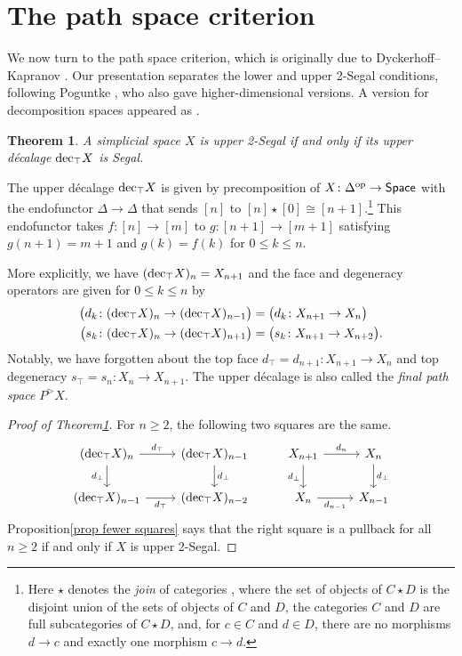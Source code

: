 \documentclass{conm-p-l}
\newtheorem{theorem}{Theorem}[section]
\theoremstyle{definition}
\theoremstyle{remark}
\newcommand{\spaces}{\mathsf{Space}}
\newcommand{\op}{\textup{op}}
\newcommand{\udec}{\textup{dec}_{\top}}
\begin{document}
\section{The path space criterion}\label{sec path space}

We now turn to the path space criterion, which is originally due to Dyckerhoff--Kapranov \cite[Theorem 6.3.2]{DyckerhoffKapranov:HSS}.
Our presentation separates the lower and upper 2-Segal conditions, following Poguntke \cite{Poguntke:HSSAKT}, who also gave higher-dimensional versions.
A version for decomposition spaces appeared as \cite[Theorem 4.10]{GKT1}.

\begin{theorem}\label{thm upper path}
A simplicial space $X$ is upper 2-Segal if and only if its upper d\'ecalage $\udec X$ is Segal.
\end{theorem}

The upper d\'ecalage $\udec X$ is given by precomposition of $X \colon \Delta^\op \to \spaces$ with the endofunctor $\Delta \to \Delta$ that sends $[n]$ to $[n]\star [0] \cong [n+1]$.\footnote{
Here $\star$ denotes the \emph{join} of categories \cite[\href{https://kerodon.net/tag/0160}{Tag 0160}]{kerodon}, where the set of objects of $C \star D$ is the disjoint union of the sets of objects of $C$ and $D$, the categories $C$ and $D$ are full subcategories of $C\star D$, and, for $c\in C$ and $d\in D$, there are no morphisms $d\to c$ and exactly one morphism $c\to d$.}
This endofunctor takes $f\colon [n] \to [m]$ to $g\colon [n+1] \to [m+1]$ satisfying $g(n+1) = m+1$ and $g(k) = f(k)$ for $0\leq k \leq n$.

More explicitly, we have $(\udec X)_n = X_{n+1}$ and the face and degeneracy operators are given for $0 \leq k \leq n$ by
\begin{align*} 
\big( d_k \colon (\udec X)_n \to (\udec X)_{n-1} \big) &= \big( d_k \colon X_{n+1} \to X_n \big)
\\
\big( s_k \colon (\udec X)_n \to (\udec X)_{n+1} \big) &= \big( s_k \colon X_{n+1} \to X_{n+2} \big).
\end{align*}
Notably, we have forgotten about the top face $d_\top = d_{n+1} \colon X_{n+1} \to X_n$ and top degeneracy $s_\top = s_n \colon X_n \to X_{n+1}$.
The upper d\'ecalage is also called the \emph{final path space} $P^\triangleright X$.

\begin{proof}[Proof of Theorem\nobreakspace \ref {thm upper path}]
For $n\geq 2$, the following two squares are the same.
\[ \begin{tikzcd}
(\udec X)_n \rar{d_\top} \dar[swap]{d_\bot}  & (\udec X)_{n-1} \dar{d_\bot} 
&  
X_{n+1} \rar{d_n} \dar[swap]{d_\bot}  & X_n \dar{d_\bot}
\\
(\udec X)_{n-1} \rar[swap]{d_\top} & (\udec X)_{n-2}
&  
X_n \rar[swap]{d_{n-1}} & X_{n-1}
\end{tikzcd} \]
Proposition\nobreakspace \ref {prop fewer squares} says that the right square is a pullback for all $n\geq 2$ if and only if $X$ is upper 2-Segal.
\end{proof}
\end{document}
